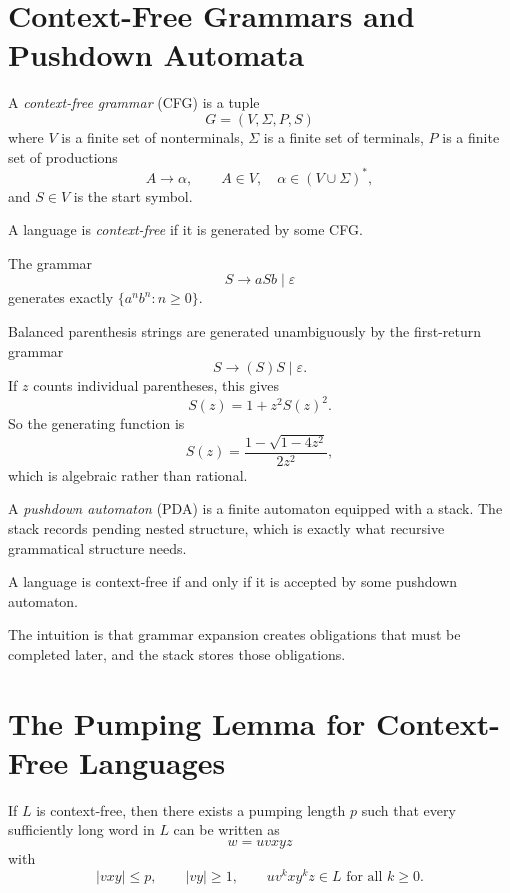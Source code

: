 \section{Context-Free Grammars and Pushdown Automata}

\begin{definition}
A \emph{context-free grammar} (CFG) is a tuple
\[
  G = (V,\Sigma,P,S)
\]
where $V$ is a finite set of nonterminals, $\Sigma$ is a finite set of terminals, $P$ is a finite set of productions
\[
  A \to \alpha,
  \qquad A \in V,
  \quad \alpha \in (V \cup \Sigma)^*,
\]
and $S \in V$ is the start symbol.
\end{definition}

A language is \emph{context-free} if it is generated by some CFG.

\begin{example}[$a^n b^n$]
The grammar
\[
  S \to aSb \mid \varepsilon
\]
generates exactly $\{a^n b^n : n \ge 0\}$.
\end{example}

\begin{example}
Balanced parenthesis strings are generated unambiguously by the first-return grammar
\[
  S \to (S)S \mid \varepsilon.
\]
If $z$ counts individual parentheses, this gives
\[
  S(z) = 1 + z^2 S(z)^2.
\]
So the generating function is
\[
  S(z) = \frac{1-\sqrt{1-4z^2}}{2z^2},
\]
which is algebraic rather than rational.
\end{example}

A \emph{pushdown automaton} (PDA) is a finite automaton equipped with a stack. The stack records pending nested structure, which is exactly what recursive grammatical structure needs.

\begin{theorem}[CFG $=$ PDA, used as a black box]
A language is context-free if and only if it is accepted by some pushdown automaton.
\end{theorem}

The intuition is that grammar expansion creates obligations that must be completed later, and the stack stores those obligations.

\section{The Pumping Lemma for Context-Free Languages}

\begin{theorem}
If $L$ is context-free, then there exists a pumping length $p$ such that every sufficiently long word in $L$ can be written as
\[
  w = uvxyz
\]
with
\[
  |vxy| \le p,
  \qquad
  |vy| \ge 1,
  \qquad
  uv^k x y^k z \in L \text{ for all } k \ge 0.
\]
\end{theorem}

